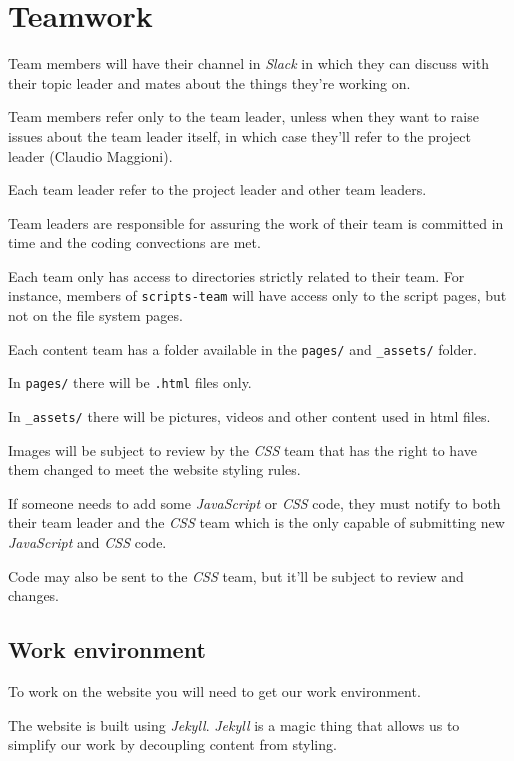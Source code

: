 \documentclass[hidelinks,12pt,a4paper,numbers=enddot]{scrartcl}
\begin{document}
\newpage

\section{Teamwork}\label{teamwork}

Team members will have their channel in \emph{Slack} in which they can discuss
with their topic leader and mates about the things they're working on.

Team members refer only to the team leader, unless when they want to
raise issues about the team leader itself, in which case they'll refer to the
project leader (Claudio Maggioni).

Each team leader refer to the project leader and other team leaders.

Team leaders are responsible for assuring the work of their team is
committed in time and the coding convections are met.

Each team only has access to directories strictly related to their team.
For instance, members of \texttt{scripts-team} will have access only to
the script pages, but not on the file system pages.

Each content team has a folder available in the \texttt{pages/} and
\texttt{\_assets/} folder.

In \texttt{pages/} there will be \texttt{.html} files only.

In \texttt{\_assets/} there will be pictures, videos and other content used
in html files.

Images will be subject to review by the \emph{CSS} team that has the right to
have them changed to meet the website styling rules.

If someone needs to add some \emph{JavaScript} or \emph{CSS} code, they must notify to
both their team leader and the \emph{CSS} team which is the only capable of
submitting new \emph{JavaScript} and \emph{CSS} code.

Code may also be sent to the \emph{CSS} team, but it'll be subject to review
and changes.

\subsection{Work environment}\label{work-environment}

To work on the website you will need to get our work environment.

The website is built using \emph{Jekyll}. \emph{Jekyll} is a magic thing that
allows us to simplify our work by decoupling content from styling.
\end{document}
